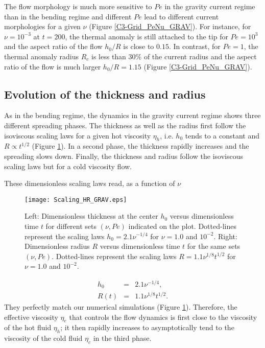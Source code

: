 The flow  morphology is  much more  sensitive to  $Pe$ in  the gravity
current regime than  in the bending regime and different  $Pe$ lead to
different   current   morphologies   for   a   given   $\nu$   (Figure
\ref{C3-Grid_PeNu_GRAV}).  For instance, for $\nu=10^{-3}$ at $t=200$,
the thermal anomaly is  still attached to the tip for  $Pe = 10^3$ and
the aspect ratio of the flow $h_0/R$ is close to $0.15$.  In contrast,
for $Pe=1$,  the thermal anomaly radius  $R_c$ is less than  $30\%$ of
the current  radius and the  aspect ratio of  the flow is  much larger
$h_0/R = 1.15$ (Figure \ref{C3-Grid_PeNu_GRAV}).

\subsection{Evolution of the thickness and radius}
\label{C3-sec:evol-thickn-radi-g}
  
As in the  bending regime, the dynamics in the  gravity current regime
shows three different spreading phases.   The thickness as well as the
radius  first follow  the  isoviscous  scaling laws  for  a given  hot
viscosity   $\eta_h$,   i.e.    $h_0$   tends  to   a   constant   and
$R\propto  t^{1/2}$ (Figure  \ref{C3-Scaling_HR_GRAV}).   In a  second
phase, the thickness  rapidly increases and the  spreading slows down.
Finally, the thickness  and radius follow the  isoviscous scaling laws
but for a cold viscosity flow.

These dimensionless scaling laws read, as a function of $\nu$
\begin{figure}[h!]
  \begin{center}
    \graphicspath{ {/Users/thorey/Documents/These/Projet/Refroidissement/Skin_Model/Figure/JFM_V13/} }
    \texttt{[image: Scaling\_HR\_GRAV.eps]}
    \caption{Left: Dimensionless thickness at  the center $h_0$ versus
      dimensionless time  $t$ for different sets  $(\nu,Pe)$ indicated
      on   the  plot.    Dotted-lines  represent   the  scaling   laws
      $h_0=  2.1\nu^{-1/4}$ for  $\nu  = 1.0$  and $10^{-2}$.   Right:
      Dimensionless radius  $R$ versus dimensionless time  $t$ for the
      same sets  $(\nu,Pe)$.  Dotted-lines represent the  scaling laws
      $R= 1.1\nu^{1/8}t^{1/2}$ for $\nu = 1.0$ and $10^{-2}$.}
    \label{C3-Scaling_HR_GRAV}
  \end{center}
\end{figure}

\begin{eqnarray}
  h_0 &=& 2.1\nu^{-1/4}\label{C3-scaling-H-gravi-2},\\
  R(t) &=& 1.1\nu^{1/8} t^{1/2}\label{C3-scaling-R-gravi-2}.
\end{eqnarray}
They    perfectly   match    our    numerical   simulations    (Figure
\ref{C3-Scaling_HR_GRAV}).    Therefore,   the   effective   viscosity
$\eta_e$  that  controls the  flow  dynamics  is  first close  to  the
viscosity  of the  hot fluid  $\eta_h$; it  then rapidly  increases to
asymptotically tend to the viscosity of the cold fluid $\eta_c$ in the
third phase.

